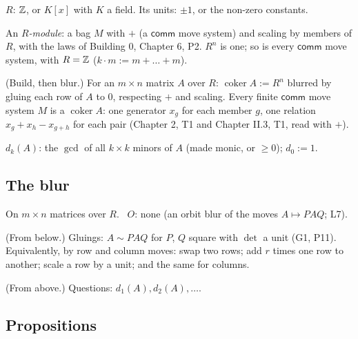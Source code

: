 \begin{lines}
\item[\lab{D1}] $R$: $\mathbb{Z}$, or $K[x]$ with $K$ a field. Its units: $\pm 1$, or the non-zero constants.
\item[\lab{D2}] An \emph{$R$-module}: a bag $M$ with $+$ (a $\mathsf{comm}$ move system) and scaling by members of $R$, with the laws of Building 0, Chapter 6, P2. $R^n$ is one; so is every $\mathsf{comm}$ move system, with $R = \mathbb{Z}$ ($k \cdot m := m + \dots + m$).
\item[\lab{D3}] (Build, then blur.) For an $m \times n$ matrix $A$ over $R$: $\operatorname{coker} A := R^n$ blurred by gluing each row of $A$ to $0$, respecting $+$ and scaling. Every finite $\mathsf{comm}$ move system $M$ is a $\operatorname{coker} A$: one generator $x_g$ for each member $g$, one relation $x_g + x_h - x_{g+h}$ for each pair (Chapter 2, T1 and Chapter II.3, T1, read with $+$).
\item[\lab{D4}] $d_k(A)$: the $\gcd$ of all $k \times k$ minors of $A$ (made monic, or $\ge 0$); $d_0 := 1$.
\end{lines}

\subsection*{The blur}

On $m \times n$ matrices over $R$. \ $O$: none (an orbit blur of the moves $A \mapsto PAQ$; L7).

\begin{lines}
\item[\lab{B1}] (From below.) Gluings: $A \sim PAQ$ for $P$, $Q$ square with $\det$ a unit (G1, P11). Equivalently, by row and column moves: swap two rows; add $r$ times one row to another; scale a row by a unit; and the same for columns.
\item[\lab{B2}] (From above.) Questions: $d_1(A), d_2(A), \dots$.
\end{lines}

\subsection*{Propositions}

